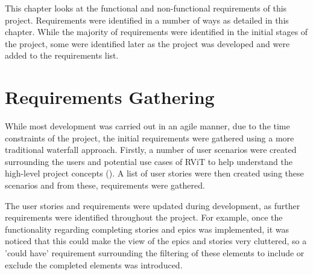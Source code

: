 \documentclass[l4proj.tex]{subfiles}
\begin{document}
    

This chapter looks at the functional and non-functional requirements of this project. Requirements were identified in a number of ways as detailed in this chapter. While the majority of requirements were identified in the initial stages of the project, some were identified later as the project was developed and were added to the requirements list.

\section{Requirements Gathering}
While most development was carried out in an agile manner, due to the time constraints of the project, the initial requirements were gathered using a more traditional waterfall approach. Firstly, a number of user scenarios were created surrounding the users and potential use cases of RViT to help understand the high-level project concepts (\cite{Evans2005}). A list of user stories were then created using these scenarios and from these, requirements were gathered.

The user stories and requirements were updated during development, as further requirements were identified throughout the project. For example, once the functionality regarding completing stories and epics was implemented, it was noticed that this could make the view of the epics and stories very cluttered, so a 'could have' requirement surrounding the filtering of these elements to include or exclude the completed elements was introduced.
 
\end{document}
